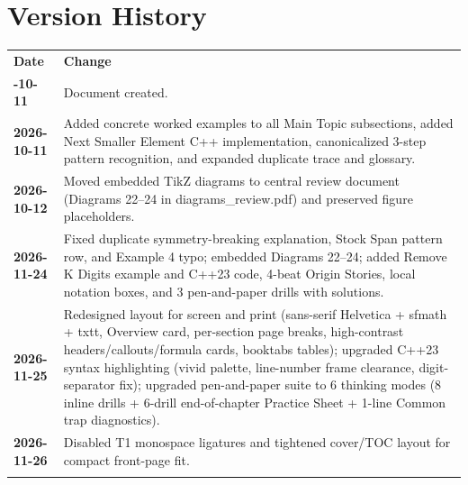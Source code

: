 \documentclass[11pt,a4paper]{article}
\theoremstyle{definition}
\begin{document}
\section*{Version History}

\begin{center}
\begingroup
\small
{}
\begin{tabularx}{\textwidth}{>{\bfseries}l >{\raggedright\arraybackslash}X}
\arrayrulecolor{primaryblue}\toprule[1.2pt]
\rowcolor{primaryblue!10}
\textcolor{primaryblue}{\textbf{Date}} & \textcolor{primaryblue}{\textbf{Change}} \\
\arrayrulecolor{codeframe}\midrule[0.6pt]
2026-10-11 & Document created. \\
2026-10-11 & Added concrete worked examples to all Main Topic subsections, added Next Smaller Element C++ implementation, canonicalized 3-step pattern recognition, and expanded duplicate trace and glossary. \\
2026-10-12 & Moved embedded TikZ diagrams to central review document (Diagrams 22--24 in diagrams\_review.pdf) and preserved figure placeholders. \\
2026-11-24 & Fixed duplicate symmetry-breaking explanation, Stock Span pattern row, and Example 4 typo; embedded Diagrams 22--24; added Remove K Digits example and C++23 code, 4-beat Origin Stories, local notation boxes, and 3 pen-and-paper drills with solutions. \\
2026-11-25 & Redesigned layout for screen and print (sans-serif Helvetica + sfmath + txtt, Overview card, per-section page breaks, high-contrast headers/callouts/formula cards, booktabs tables); upgraded C++23 syntax highlighting (vivid palette, line-number frame clearance, digit-separator fix); upgraded pen-and-paper suite to 6 thinking modes (8 inline drills + 6-drill end-of-chapter Practice Sheet + 1-line Common trap diagnostics). \\
2026-11-26 & Disabled T1 monospace ligatures and tightened cover/TOC layout for compact front-page fit. \\
\arrayrulecolor{primaryblue}\bottomrule[1.2pt]
\end{tabularx}
\endgroup
\end{center}
\end{document}
